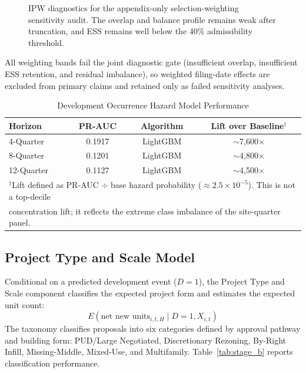 \documentclass[11pt, letterpaper]{article}
\begin{document}



\begin{figure}[H]
        \centering
        
        \caption[IPW overlap, ESS, and balance diagnostics]{IPW diagnostics for the appendix-only selection-weighting sensitivity audit. The overlap and balance profile remains weak after truncation, and ESS remains well below the 40\% admissibility threshold.}
        \label{fig:ipw_diag}
\end{figure}

\noindent All weighting bands fail the joint diagnostic gate (insufficient overlap, insufficient ESS retention, and residual imbalance), so weighted filing-date effects are excluded from primary claims and retained only as failed sensitivity analyses.

\begin{table}[H]
\centering
\caption{Development Occurrence Hazard Model Performance}
\label{tab:stagea_limits}
\begin{tabular}{lccc}
\toprule
\textbf{Horizon} & \textbf{PR-AUC} & \textbf{Algorithm} & \textbf{Lift over Baseline$^\dagger$} \\
\midrule
4-Quarter & 0.1917 & LightGBM & $\sim$7,600$\times$ \\
8-Quarter & 0.1201 & LightGBM & $\sim$4,800$\times$ \\
12-Quarter & 0.1127 & LightGBM & $\sim$4,500$\times$ \\
\bottomrule
\multicolumn{4}{l}{\footnotesize $^\dagger$Lift defined as PR-AUC $\div$ base hazard probability ($\approx 2.5 \times 10^{-5}$). This is not a top-decile}\\
\multicolumn{4}{l}{\footnotesize concentration lift; it reflects the extreme class imbalance of the site-quarter panel.}\\
\end{tabular}
\end{table}

\newpage
\subsection{Project Type and Scale Model}
\label{app:stageb}

\noindent Conditional on a predicted development event ($D=1$), the Project Type and Scale component classifies the expected project form and estimates the expected unit count:
\begin{equation}
E(\text{net new units}_{i,t,H} \mid D=1, X_{i,t})
\end{equation}
The taxonomy classifies proposals into six categories defined by approval pathway and building form: PUD/Large Negotiated, Discretionary Rezoning, By-Right Infill, Missing-Middle, Mixed-Use, and Multifamily. Table~\ref{tab:stage_b} reports classification performance.
\end{document}

